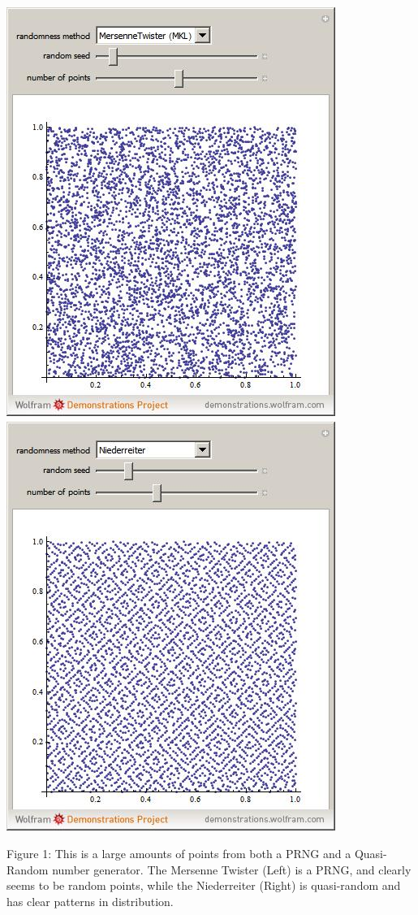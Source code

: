 \documentclass[11pt]{article}
\begin{document}
\includegraphics[scale=.5]{MersenneTwister}
\includegraphics[scale=.5]{Niederreiter}

Figure 1: This is a large amounts of points from both a PRNG and a Quasi-Random number generator. The Mersenne Twister (Left) is a PRNG, and clearly seems to be random points, while the Niederreiter (Right) is quasi-random and has clear patterns in distribution. \cite{Mersenne}
\end{document}
